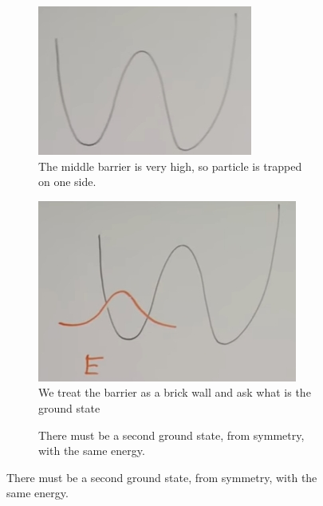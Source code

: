 \documentclass[]{article}
\begin{document}
\begin{figure}[H]
	\caption{Double well potential with very high barrier}
	\begin{subfigure}[t]{0.3\textwidth}
		\caption{The middle barrier is very high, so particle is trapped on one side.}\label{fig:aqm-7-potential}
		\includegraphics[width=\textwidth]{aqm-7-potential}
	\end{subfigure}
	\em
	\begin{subfigure}[t]{0.3\textwidth}
		\caption{We treat the barrier as a brick wall and ask what is the ground state}\label{fig:particle_mixed_left}
		\includegraphics[width=\textwidth]{particle_mixed_left}
	\end{subfigure}
	\em
	\begin{subfigure}[t]{0.3\textwidth}
		\caption{There must be a second ground state,
			from symmetry, with the same energy.}\label{fig:double:well}

\end{subfigure}
\end{figure}
\end{document}
